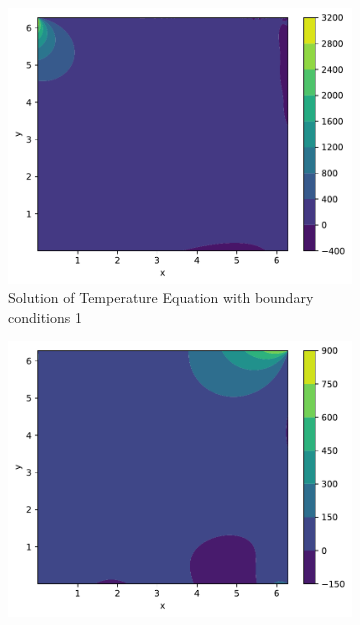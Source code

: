 \begin{figure}[ht]
    \centering
    \begin{subfigure}[b]{0.49\textwidth}
        \centering
        \includegraphics[width=\textwidth]{Figures/PINN-BO/heat_py_pde_1000_test_1.pdf}
        \caption{Solution of Temperature Equation with boundary conditions 1}
 \label{fig:heat_1_dist}
    \end{subfigure}
    \hfill
    \begin{subfigure}[b]{0.49\textwidth}
        \centering
        \includegraphics[width=1\textwidth]{Figures/PINN-BO/heat_py_pde_1000_test_2.pdf}

\end{subfigure}
\end{figure}

